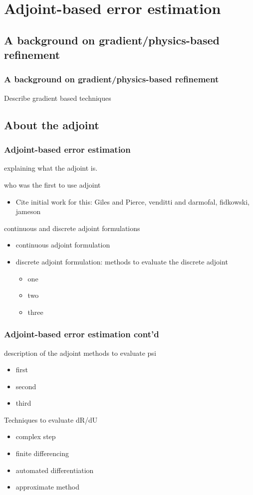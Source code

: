 \documentclass{beamer}
\begin{document}
\section[Adjoint]{Adjoint-based error estimation}

\subsection[Gradient technique]{A background on gradient/physics-based refinement}
\begin{frame}%
\frametitle{A background on gradient/physics-based refinement}
Describe gradient based techniques
\end{frame}



\subsection{About the adjoint}
\begin{frame}%
\scriptsize
\frametitle{Adjoint-based error estimation}
explaining what the adjoint is. 

who was the first to use adjoint
\begin{itemize}
\item Cite initial work for this: Giles and Pierce, venditti and darmofal, fidkowski, jameson
\end{itemize}

continuous and discrete adjoint formulations
\begin{itemize}
\item continuous adjoint formulation

\item discrete adjoint formulation: methods to evaluate the discrete adjoint
\begin{itemize}
\item one
\item two
\item three
\end{itemize}

\end{itemize}
\end{frame}

\begin{frame}
\scriptsize
\frametitle{Adjoint-based error estimation cont'd}
description of the adjoint methods to evaluate psi
\begin{itemize}
\item first
\item second
\item third
\end{itemize}
Techniques to evaluate dR/dU
\begin{itemize}
\item complex step
\item finite differencing
\item automated differentiation
\item approximate method
\end{itemize}
\end{frame}
\end{document}
